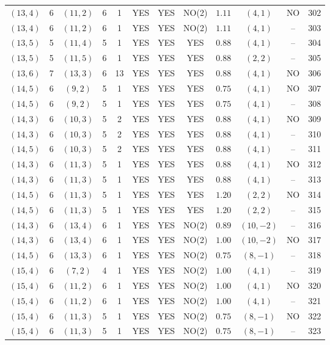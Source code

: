 \begin{longtable}{|c|c|c|c|c|c|c|c|c|c|c|c|}
$(13,4)$ & 6 & $(11,2)$ & 6 & 1 & YES & YES & NO(2) & $1.11$ & $(4,1)$ & NO & 302\\
$(13,4)$ & 6 & $(11,2)$ & 6 & 1 & YES & YES & NO(2) & $1.11$ & $(4,1)$ & -- & 303\\
$(13,5)$ & 5 & $(11,4)$ & 5 & 1 & YES & YES & YES & $0.88$ & $(4,1)$ & -- & 304\\
$(13,5)$ & 5 & $(11,5)$ & 6 & 1 & YES & YES & YES & $0.88$ & $(2,2)$ & -- & 305\\
$(13,6)$ & 7 & $(13,3)$ & 6 & 13 & YES & YES & YES & $0.88$ & $(4,1)$ & NO & 306\\
$(14,5)$ & 6 & $(9,2)$ & 5 & 1 & YES & YES & YES & $0.75$ & $(4,1)$ & NO & 307\\
$(14,5)$ & 6 & $(9,2)$ & 5 & 1 & YES & YES & YES & $0.75$ & $(4,1)$ & -- & 308\\
$(14,3)$ & 6 & $(10,3)$ & 5 & 2 & YES & YES & YES & $0.88$ & $(4,1)$ & NO & 309\\
$(14,3)$ & 6 & $(10,3)$ & 5 & 2 & YES & YES & YES & $0.88$ & $(4,1)$ & -- & 310\\
$(14,5)$ & 6 & $(10,3)$ & 5 & 2 & YES & YES & YES & $0.88$ & $(4,1)$ & -- & 311\\
$(14,3)$ & 6 & $(11,3)$ & 5 & 1 & YES & YES & YES & $0.88$ & $(4,1)$ & NO & 312\\
$(14,3)$ & 6 & $(11,3)$ & 5 & 1 & YES & YES & YES & $0.88$ & $(4,1)$ & -- & 313\\
$(14,5)$ & 6 & $(11,3)$ & 5 & 1 & YES & YES & YES & $1.20$ & $(2,2)$ & NO & 314\\
$(14,5)$ & 6 & $(11,3)$ & 5 & 1 & YES & YES & YES & $1.20$ & $(2,2)$ & -- & 315\\
$(14,3)$ & 6 & $(13,4)$ & 6 & 1 & YES & YES & NO(2) & $0.89$ & $(10,-2)$ & -- & 316\\
$(14,3)$ & 6 & $(13,4)$ & 6 & 1 & YES & YES & NO(2) & $1.00$ & $(10,-2)$ & NO & 317\\
$(14,5)$ & 6 & $(13,3)$ & 6 & 1 & YES & YES & NO(2) & $0.75$ & $(8,-1)$ & -- & 318\\
$(15,4)$ & 6 & $(7,2)$ & 4 & 1 & YES & YES & NO(2) & $1.00$ & $(4,1)$ & -- & 319\\
$(15,4)$ & 6 & $(11,2)$ & 6 & 1 & YES & YES & NO(2) & $1.00$ & $(4,1)$ & NO & 320\\
$(15,4)$ & 6 & $(11,2)$ & 6 & 1 & YES & YES & NO(2) & $1.00$ & $(4,1)$ & -- & 321\\
$(15,4)$ & 6 & $(11,3)$ & 5 & 1 & YES & YES & NO(2) & $0.75$ & $(8,-1)$ & NO & 322\\
$(15,4)$ & 6 & $(11,3)$ & 5 & 1 & YES & YES & NO(2) & $0.75$ & $(8,-1)$ & -- & 323\\

\end{longtable}
